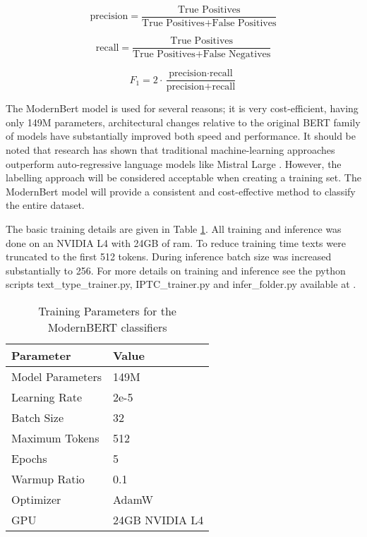 \documentclass{article} %
\begin{document}
\begin{equation}
\text{precision} = \frac{\text{True Positives}}{\text{True Positives} + \text{False Positives}}
\label{eq:precision}
\end{equation}

\begin{equation}
\text{recall} = \frac{\text{True Positives}}{\text{True Positives} + \text{False Negatives}}
\label{eq:recall}
\end{equation}

\begin{equation}
F_1 = 2 \cdot \frac{\text{precision} \cdot \text{recall}}{\text{precision} + \text{recall}}
\label{eq:f1}
\end{equation}

The ModernBert model is used for several reasons; it is very cost-efficient, having only 149M parameters, architectural changes relative to the original BERT family of models \cite{devlin_bert_2019, liu_roberta_2019, he_deberta_2021} have substantially improved both speed and performance. It should be noted that research has shown that traditional machine-learning approaches outperform auto-regressive language models like Mistral Large \cite{bohacek_when_2024}. However, the labelling approach will be considered acceptable when creating a training set. The ModernBert model will provide a consistent and cost-effective method to classify the entire dataset.

The basic training details are given in Table \ref{tab:bert_params}. All training and inference was done on an NVIDIA L4 with 24GB of ram. To reduce training time texts were truncated to the first 512 tokens. During inference batch size was increased substantially to 256. For more details on training and inference see the python scripts text\_type\_trainer.py, IPTC\_trainer.py and infer\_folder.py available at \cite{bourne_codebase_2025}.

\begin{table}
\centering
\begin{tabular}{ll}
\hline
\textbf{Parameter} & \textbf{Value} \\
\hline
Model Parameters & 149M \\
Learning Rate & 2e-5 \\
Batch Size & 32 \\
Maximum Tokens & 512 \\
Epochs & 5 \\
Warmup Ratio & 0.1 \\
Optimizer & AdamW \\
GPU & 24GB NVIDIA L4 \\
\hline
\end{tabular}
\caption{Training Parameters for the ModernBERT classifiers}
\label{tab:bert_params}
\end{table}
\end{document}
